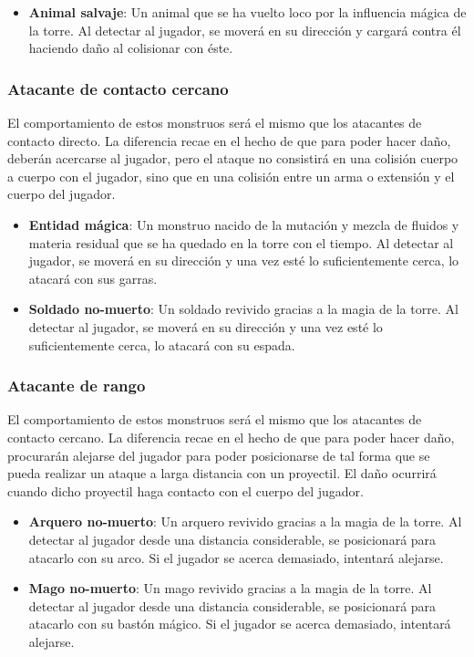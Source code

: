 \begin{itemize}
    \item \textbf{Animal salvaje}: Un animal que se ha vuelto loco por la
    influencia mágica de la torre. Al detectar al jugador, se moverá en su
    dirección y cargará contra él haciendo daño al colisionar con éste.
\end{itemize}


\subsubsection{Atacante de contacto cercano}

El comportamiento de estos monstruos será el mismo que los atacantes de contacto
directo. La diferencia recae en el hecho de que para poder hacer daño, deberán
acercarse al jugador, pero el ataque no consistirá en una colisión cuerpo a
cuerpo con el jugador, sino que en una colisión entre un arma o extensión y el
cuerpo del jugador.

\begin{itemize}
    \item \textbf{Entidad mágica}: Un monstruo nacido de la mutación y mezcla de fluidos y
    materia residual que se ha quedado en la torre con el tiempo. Al detectar al
    jugador, se moverá en su dirección y una vez esté lo suficientemente cerca,
    lo atacará con sus garras.
    \item \textbf{Soldado no-muerto}: Un soldado revivido gracias a la magia de
    la torre. Al detectar al jugador, se moverá en su dirección y una vez esté
    lo suficientemente cerca, lo atacará con su espada.
\end{itemize}

\subsubsection{Atacante de rango}

El comportamiento de estos monstruos será el mismo que los atacantes de contacto
cercano. La diferencia recae en el hecho de que para poder hacer daño,
procurarán alejarse del jugador para poder posicionarse de tal forma que se
pueda realizar un ataque a larga distancia con un proyectil. El daño ocurrirá
cuando dicho proyectil haga contacto con el cuerpo del jugador.

\begin{itemize}
    \item \textbf{Arquero no-muerto}: Un arquero revivido gracias a la magia de
    la torre. Al detectar al jugador desde una distancia considerable, se
    posicionará para atacarlo con su arco. Si el jugador se acerca demasiado,
    intentará alejarse.
    \item \textbf{Mago no-muerto}: Un mago revivido gracias a la magia de
    la torre. Al detectar al jugador desde una distancia considerable, se
    posicionará para atacarlo con su bastón mágico. Si el jugador se acerca
    demasiado, intentará alejarse.
\end{itemize}

